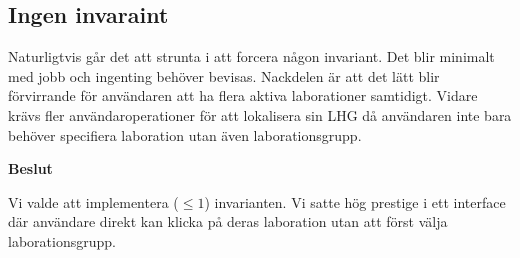 \subsection{Ingen invaraint}
Naturligtvis går det att strunta i att forcera någon invariant. Det blir minimalt med jobb och ingenting behöver bevisas. Nackdelen är att det lätt blir förvirrande för användaren att ha flera aktiva laborationer samtidigt. Vidare krävs fler användaroperationer för att lokalisera sin LHG då användaren inte bara behöver specifiera laboration utan även laborationsgrupp.

\begin{flushright}
  
  \textbf{Beslut}
  
  Vi valde att implementera ($\leq 1$) invarianten. Vi satte hög prestige i ett interface där användare direkt kan klicka på deras laboration utan att först välja laborationsgrupp.
\end{flushright}
